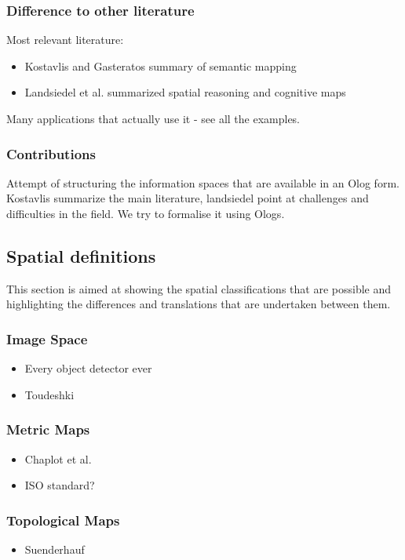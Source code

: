 \documentclass[a4paper,12pt]{article}
\theoremstyle{mytheor}
\begin{document}
\subsubsection{Difference to other literature}
Most relevant literature:
\begin{itemize}
    \item Kostavlis and Gasteratos summary of semantic mapping~\cite{kostavelis_semantic_2015}
    \item Landsiedel et al. summarized spatial reasoning and cognitive maps~\cite{landsiedel_review_2017}
\end{itemize}
Many applications that actually use it - see all the examples.
\subsubsection{Contributions}
Attempt of structuring the information spaces that are available in an Olog form. Kostavlis summarize the main literature, landsiedel point at challenges and difficulties in the field. We try to formalise it using Ologs. 

\subsection{Spatial definitions}
This section is aimed at showing the spatial classifications that are possible and highlighting the differences and translations that are undertaken between them.
\subsubsection{Image Space}
\begin{itemize}
    \item Every object detector ever 
    \item Toudeshki~\cite{toudeshki_robust_2018}
\end{itemize}
\subsubsection{Metric Maps}
\begin{itemize}
    \item Chaplot et al.~\cite{chaplot_object_2020}
    \item ISO standard?
\end{itemize}
\subsubsection{Topological Maps}
\begin{itemize}
    \item Suenderhauf~\cite{sunderhauf_where_2019}
\end{itemize}
\end{document}
